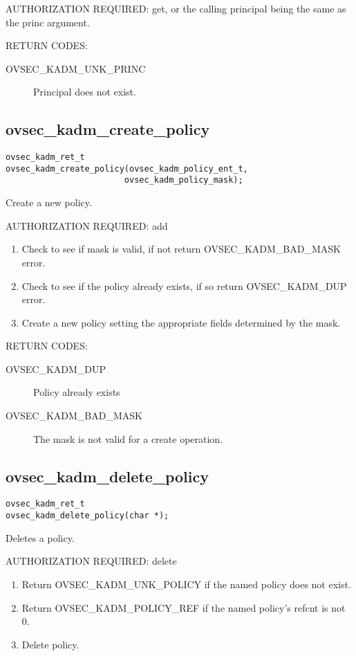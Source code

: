 AUTHORIZATION REQUIRED: get, or the calling principal being the same
as the princ argument.

RETURN CODES:

\begin{description}
\item[OVSEC_KADM_UNK_PRINC] Principal does not exist.
\end{description}

\subsection{ovsec_kadm_create_policy}

\begin{verbatim}
ovsec_kadm_ret_t
ovsec_kadm_create_policy(ovsec_kadm_policy_ent_t,
                        ovsec_kadm_policy_mask); 
\end{verbatim}

Create a new policy.

AUTHORIZATION REQUIRED: add

\begin{enumerate}
\item Check to see if mask is valid, if not return OVSEC_KADM_BAD_MASK error.
\item Check to see if the policy already exists, if so return
OVSEC_KADM_DUP error. 
\item Create a new policy setting the appropriate fields determined
by the mask.
\end{enumerate}

RETURN CODES:

\begin{description}
\item[OVSEC_KADM_DUP] Policy already exists
\item[OVSEC_KADM_BAD_MASK] The mask is not valid for a create
operation.
\end{description}

\subsection{ovsec_kadm_delete_policy}

\begin{verbatim}
ovsec_kadm_ret_t
ovsec_kadm_delete_policy(char *);
\end{verbatim}

Deletes a policy.

AUTHORIZATION REQUIRED: delete

\begin{enumerate}
\item Return OVSEC_KADM_UNK_POLICY if the named policy does not exist.
\item Return OVSEC_KADM_POLICY_REF if the named policy's refcnt is not 0.
\item Delete policy.
\end{enumerate}

